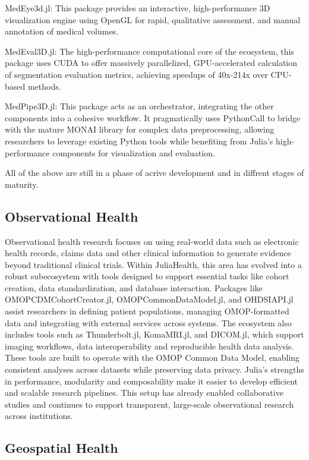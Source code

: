 \documentclass{juliacon}
\begin{document}
MedEye3d.jl: This package provides an interactive, high-performance 3D visualization engine using OpenGL for rapid, qualitative assessment, and manual annotation of medical volumes.

MedEval3D.jl: The high-performance computational core of the ecosystem, this package uses CUDA to offer massively parallelized, GPU-accelerated calculation of segmentation evaluation metrics, achieving speedups of 40x-214x over CPU-based methods.

MedPipe3D.jl: This package acts as an orchestrator, integrating the other components into a cohesive workflow. It pragmatically uses PythonCall to bridge with the mature MONAI library for complex data preprocessing, allowing researchers to leverage existing Python tools while benefiting from Julia's high-performance components for visualization and evaluation.

All of the above are still in a phase of acrive development and in diffrent stages of maturity.

\subsection{Observational Health}

Observational health research focuses on using real-world data such as electronic health records, claims data and other clinical information to generate evidence beyond traditional clinical trials. Within JuliaHealth, this area has evolved into a robust subecosystem with tools designed to support essential tasks like cohort creation, data standardization, and database interaction. Packages like OMOPCDMCohortCreator.jl, OMOPCommonDataModel.jl, and OHDSIAPI.jl assist researchers in defining patient populations, managing OMOP-formatted data and integrating with external services across systems. The ecosystem also includes tools such as Thunderbolt.jl, KomaMRI.jl, and DICOM.jl, which support imaging workflows, data interoperability and reproducible health data analysis. These tools are built to operate with the OMOP Common Data Model, enabling consistent analyses across datasets while preserving data privacy. Julia’s strengths in performance, modularity and composability make it easier to develop efficient and scalable research pipelines. This setup has already enabled collaborative studies and continues to support transparent, large-scale observational research across institutions.

\subsection{Geospatial Health}
\end{document}
